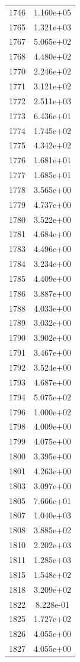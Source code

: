 \documentclass[12pt]{article}
\begin{document}
\begin{longtable}{@{}cc@{}}
1746 & 1.160e+05 \\
1765 & 1.321e+03 \\
1767 & 5.065e+02 \\
1768 & 4.480e+02 \\
1770 & 2.246e+02 \\
1771 & 3.121e+02 \\
1772 & 2.511e+03 \\
1773 & 6.436e+01 \\
1774 & 1.745e+02 \\
1775 & 4.342e+02 \\
1776 & 1.681e+01 \\
1777 & 1.685e+01 \\
1778 & 3.565e+00 \\
1779 & 4.737e+00 \\
1780 & 3.522e+00 \\
1781 & 4.684e+00 \\
1783 & 4.496e+00 \\
1784 & 3.234e+00 \\
1785 & 4.409e+00 \\
1786 & 3.887e+00 \\
1788 & 4.033e+00 \\
1789 & 3.032e+00 \\
1790 & 3.902e+00 \\
1791 & 3.467e+00 \\
1792 & 3.524e+00 \\
1793 & 4.687e+00 \\
1794 & 5.075e+02 \\
1796 & 1.000e+02 \\
1798 & 4.009e+00 \\
1799 & 4.075e+00 \\
1800 & 3.395e+00 \\
1801 & 4.263e+00 \\
1803 & 3.097e+00 \\
1805 & 7.666e+01 \\
1807 & 1.040e+03 \\
1808 & 3.885e+02 \\
1810 & 2.202e+03 \\
1811 & 1.285e+03 \\
1815 & 1.548e+02 \\
1818 & 3.209e+02 \\
1822 & 8.228e-01 \\
1825 & 1.727e+02 \\
1826 & 4.055e+00 \\
1827 & 4.055e+00 \\

\end{longtable}
\end{document}

